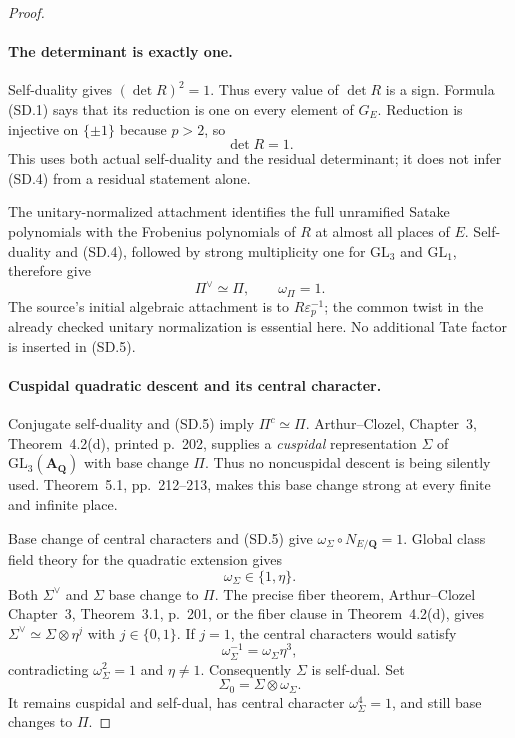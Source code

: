 \begin{proof}
\paragraph{The determinant is exactly one.}
Self-duality gives $(\det R)^2=1$.  Thus every value of $\det R$
is a sign.  Formula (SD.1) says that its reduction is one on every
element of $G_E$.  Reduction is injective on $\{\pm1\}$ because
$p>2$, so
\[
                              \det R=1.                  \tag{SD.4}
\]
This uses both actual self-duality and the residual determinant;
it does not infer (SD.4) from a residual statement alone.

The unitary-normalized attachment identifies the full unramified
Satake polynomials with the Frobenius polynomials of $R$ at almost
all places of $E$.  Self-duality and (SD.4), followed by strong
multiplicity one for $\mathrm{GL}_3$ and $\mathrm{GL}_1$, therefore
give
\[
                  \Pi^\vee\simeq\Pi,
                  \qquad\omega_\Pi=1.                   \tag{SD.5}
\]
The source's initial algebraic attachment is to
$R\varepsilon_p^{-1}$; the common twist in the already checked
unitary normalization is essential here.  No additional Tate
factor is inserted in (SD.5).

\paragraph{Cuspidal quadratic descent and its central character.}
Conjugate self-duality and (SD.5) imply
$\Pi^c\simeq\Pi$.  Arthur--Clozel, Chapter~3,
Theorem~4.2(d), printed p.~202, supplies a \emph{cuspidal}
representation $\Sigma$ of $\mathrm{GL}_3(\mathbf A_{\mathbf Q})$
with base change $\Pi$.  Thus no noncuspidal descent is being
silently used.  Theorem~5.1, pp.~212--213, makes this base change
strong at every finite and infinite place.

Base change of central characters and (SD.5) give
$\omega_\Sigma\circ N_{E/\mathbf Q}=1$.
Global class field theory for the quadratic extension gives
\[
                              \omega_\Sigma\in\{1,\eta\}.
                                                               \tag{SD.6}
\]
Both $\Sigma^\vee$ and $\Sigma$ base change to $\Pi$.
The precise fiber theorem, Arthur--Clozel Chapter~3,
Theorem~3.1, p.~201, or the fiber clause in Theorem~4.2(d),
gives $\Sigma^\vee\simeq\Sigma\otimes\eta^j$ with
$j\in\{0,1\}$.  If $j=1$, the central characters would satisfy
\[
                 \omega_\Sigma^{-1}
                          =\omega_\Sigma\eta^3,
\]
contradicting $\omega_\Sigma^2=1$ and $\eta\ne1$.
Consequently $\Sigma$ is self-dual.  Set
\[
                          \Sigma_0=\Sigma\otimes\omega_\Sigma.
                                                               \tag{SD.7}
\]
It remains cuspidal and self-dual, has central character
$\omega_\Sigma^4=1$, and still base changes to $\Pi$.


\end{proof}
